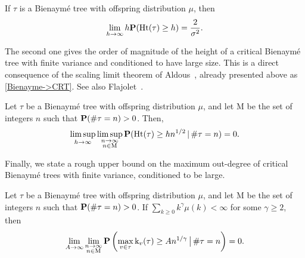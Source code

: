 \documentclass[11pt,reqno]{amsart}
\newcommand{\Ht}{\mathrm{Ht}}
\newcommand{\rk}{\mathrm{k}}
\begin{document}
\begin{prop}
  \label{single_tree_height}
  If $\tau$ is a Bienaymé tree with offspring distribution $\mu$, then
  \[ \lim_{h\to\infty} h\P(\Ht(\tau)\geq h) = \frac{2}{\sigma^2}. \]
\end{prop}

The second one gives the order of magnitude of the height of a critical Bienaymé tree with finite variance and conditioned to have large size. This is a direct consequence of the scaling limit theorem of Aldous~\cite[Theorem~2.23]{aldous1993continuumIII}, already presented above as \eqref{Bienayme->CRT}. See also Flajolet~\cite{flajolet1982average}.

\begin{prop}
\label{prop:conditioned_tree_height}
  Let $\tau$ be a Bienaym\'{e} tree with offspring distribution $\mu$,  and let $\mathrm{M}$ be the set of integers $n$ such that $\P(\#\tau=n)>0$. Then,
  \[\limsup_{h\to\infty}\limsup_{\substack{n\to\infty\\ n\in\mathrm{M}}} \P(\Ht(\tau)\geq h n^{1/2} \,|\, \#\tau=n)=0.\]
\end{prop}

Finally, we state a rough upper bound on the maximum out-degree of critical Bienaymé trees with finite variance, conditioned to be large.

\begin{lem}
\label{lem:maximum_degree}
    Let $\tau$ be a Bienaym\'{e} tree with offspring distribution $\mu$, and let $\mathrm{M}$ be the set of integers $n$ such that $\P(\#\tau=n)>0$. If $\sum_{k\geq 0} k^{\gamma}\mu(k) < \infty$ for some $\gamma \geq 2$, then
    $$
    \lim_{A \to \infty}\lim_{\substack{n \to \infty\\ n\in\mathrm{M}}} \prob\left( \max_{v \in \tau} \rk_v(\tau) \geq An^{1/\gamma} \, \big| \, \#\tau =n \right) = 0.
    $$
\end{lem}
\end{document}
